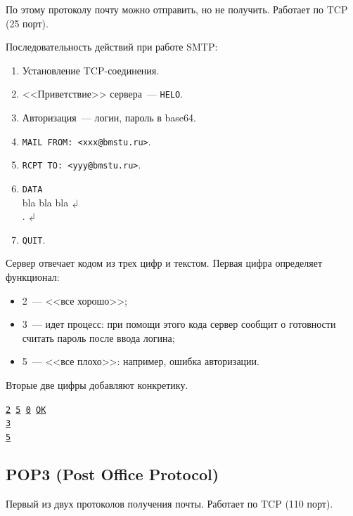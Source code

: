 По этому протоколу почту можно отправить, но не получить. Работает по TCP (25 порт).

Последовательность действий при работе SMTP:

\begin{enumerate}
    \item Установление TCP-соединения.
    \item <<Приветствие>> сервера~--- \texttt{HELO}.
    \item Авторизация~--- логин, пароль в base64.
    \item \texttt{MAIL FROM: <xxx@bmstu.ru>}.
    \item \texttt{RCPT TO: <yyy@bmstu.ru>}.
    \item \texttt{DATA}\\
          bla bla bla$\dlsh$\\
          .$\dlsh$
    \item \texttt{QUIT}.
\end{enumerate}

Сервер отвечает кодом из трех цифр и текстом. Первая цифра определяет функционал:

\begin{itemize}
    \item 2~--- <<все хорошо>>;
    \item 3~--- идет процесс: при помощи этого кода сервер сообщит о готовности считать пароль после ввода логина;
    \item 5~--- <<все плохо>>: например, ошибка авторизации.
\end{itemize}

Вторые две цифры добавляют конкретику.

\begin{center}
    \texttt{\underline{2}\,\underline{5}\,\underline{0} \underline{OK}}\\
    \texttt{\underline{3}\,\underline{\phantom{5}}\,\underline{\phantom{5}} \underline{\phantom{OK}}}\\
    \texttt{\underline{5}\,\underline{\phantom{5}}\,\underline{\phantom{5}} \underline{\phantom{OK}}}
\end{center}

\subsection{POP3 (Post Office Protocol)}

Первый из двух протоколов получения почты. Работает по TCP (110 порт).


